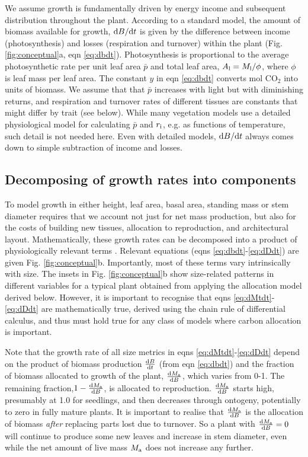 \documentclass[a4paper,11pt]{article}
\begin{document}
We assume growth is fundamentally driven by energy income and subsequent distribution throughout the plant. According to a standard model, the amount of biomass available for growth, ${\rm d}B / {\rm d}t$ is given by the difference between income (photosynthesis) and losses (respiration and turnover) within the plant \citep{Makela-1997, Thornley-2000} (Fig. \ref{fig:conceptual}a, eqn \ref{eq:dbdt}). Photosynthesis is proportional to the average photosynthetic rate per unit leaf area $\bar{p}$ and total leaf area, $A_{\rm l} = M_{\rm l} / \phi$, where $\phi$ is leaf mass per leaf area. The constant $y$ in eqn \ref{eq:dbdt} converts mol CO$_2$ into units of biomass. We assume that  that $\bar{p}$ increases with light but with diminishing returns, and respiration and turnover rates of different tissues are constants that might differ by trait (see below). While many vegetation models use a detailed physiological model for calculating $\bar{p}$ and $r_{\rm i}$, e.g. as functions of temperature, such detail is not needed here. Even with detailed models, ${\rm d}B / {\rm d}t$ always comes down to simple subtraction of income and losses.

\subsection{Decomposing of growth rates into components}

To model growth in either height, leaf area, basal area, standing mass or stem diameter requires that we account not just for net mass production, but also for the costs of building new tissues, allocation to reproduction, and architectural layout. Mathematically, these growth rates can be decomposed into a product of physiologically relevant terms \citep{Falster-2011, Gibert-2016}. Relevant equations (eqns \ref{eq:dbdt}-\ref{eq:dDdt}) are given Fig. \ref{fig:conceptual}b. Importantly, most of these terms vary intrinsically with size. The insets in Fig. \ref{fig:conceptual}b show size-related patterns in different variables for a typical plant obtained from applying the allocation model derived below. However, it is important to recognise that eqns \ref{eq:dMtdt}-\ref{eq:dDdt} are mathematically true, derived using the chain rule of differential calculus, and thus must hold true for any class of models where carbon allocation is important.

Note that the growth rate of all size metrics in eqns \ref{eq:dMtdt}-\ref{eq:dDdt} depend on the product of biomass production $\frac{{\rm d}B} {{\rm d}t}$ (from eqn \ref{eq:dbdt}) and the fraction of biomass allocated to growth of the plant, $\frac{{\rm d}M_{\rm a}}{{\rm d}B}$, which varies from 0-1. The remaining fraction,$1- \frac{{\rm d}M_{\rm a}}{{\rm d}B}$, is allocated to reproduction. $\frac{{\rm d}M_{\rm a}}{{\rm d}B}$ starts high, presumably at 1.0 for seedlings, and then decreases through ontogeny, potentially to zero in fully mature plants. It is important to realise that $\frac{{\rm d}M_{\rm a}}{{\rm d}B}$ is the allocation of biomass \emph{after} replacing parts lost due to turnover. So a plant with $\frac{{\rm d}M_{\rm a}}{{\rm d}B}=0$ will continue to produce some new leaves and increase in stem diameter, even while the net amount of live mass $M_{\rm a}$ does not increase any further.
\end{document}
